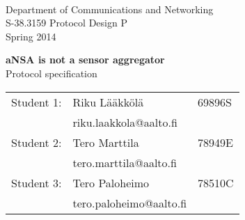 \begin{titlepage}

\begin{flushleft}
 \\
Department of Communications and Networking \\
S-38.3159 Protocol Design P \\
Spring 2014
\end{flushleft}

\vspace{8cm}
\begin{center}
  {\LARGE \textbf{aNSA is not a sensor aggregator}}\\
  {\LARGE Protocol specification}
\end{center}

\vfill

\begin{center}
\begin{tabular}{rll}
	Student 1:	& Riku Lääkkölä 	& 69896S \\
				& riku.laakkola@aalto.fi & \\    
    Student 2: 	& Tero Marttila		& 78949E \\
    			& tero.marttila@aalto.fi & \\
    Student 3:	& Tero Paloheimo	& 78510C \\
    			& tero.paloheimo@aalto.fi & \\
\end{tabular}
\end{center}

\end{titlepage}